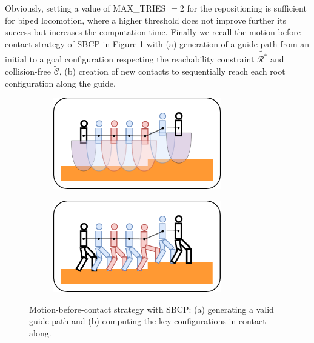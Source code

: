 Obviously, setting a value of MAX\_TRIES $=2$ for the repositioning is sufficient for biped locomotion, where a higher threshold does not improve further its success but increases the computation time.
Finally we recall the motion-before-contact strategy of SBCP in Figure \ref{fig:cp-sb:sbcp_explanation} with (a) generation of a guide path from an initial to a goal configuration respecting the reachability constraint $\tilde{\mathcal{R}^*}$ and collision-free $\tilde{\mathcal{C}}$, (b) creation of new contacts to sequentially reach each root configuration along the guide.

\begin{figure}[h]
    \captionsetup[subfigure]{justification=centering}
    \centering
    \begin{subfigure}[t]{.48\linewidth}
    \includegraphics[width=\textwidth, height=4cm]{Figures/Chapter_CPSB/sbcp_explanation_0.png}
    \caption{}
    \end{subfigure}
    \begin{subfigure}[t]{.48\linewidth}
    \includegraphics[width=\textwidth, height=4cm]{Figures/Chapter_CPSB/sbcp_explanation_1.png}
    \caption{}
    \end{subfigure}
    \caption{Motion-before-contact strategy with SBCP: (a) generating a valid guide path and (b) computing the key configurations in contact along.}
    \label{fig:cp-sb:sbcp_explanation}
\end{figure}

